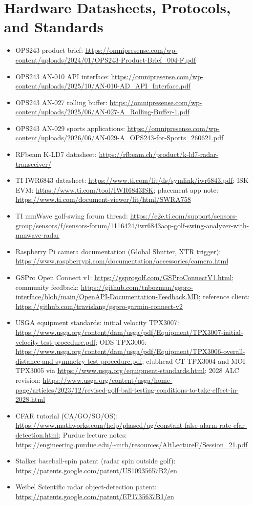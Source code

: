 \section{Hardware Datasheets, Protocols, and Standards}
\begin{itemize}\small
\item OPS243 product brief:
  \url{https://omnipresense.com/wp-content/uploads/2024/01/OPS243-Product-Brief_004-F.pdf}
\item OPS243 AN-010 API interface:
  \url{https://omnipresense.com/wp-content/uploads/2025/10/AN-010-AD_API_Interface.pdf}
\item OPS243 AN-027 rolling buffer:
  \url{https://omnipresense.com/wp-content/uploads/2025/06/AN-027-A_Rolling-Buffer-1.pdf}
\item OPS243 AN-029 sports applications:
  \url{https://omnipresense.com/wp-content/uploads/2026/06/AN-029-A_OPS243-for-Sports_260621.pdf}
\item RFbeam K-LD7 datasheet:
  \url{https://rfbeam.ch/product/k-ld7-radar-transceiver/}
\item TI IWR6843 datasheet:
  \url{https://www.ti.com/lit/ds/symlink/iwr6843.pdf}; ISK EVM:
  \url{https://www.ti.com/tool/IWR6843ISK}; placement app note:
  \url{https://www.ti.com/document-viewer/lit/html/SWRA758}
\item TI mmWave golf-swing forum thread:
  \url{https://e2e.ti.com/support/sensors-group/sensors/f/sensors-forum/1116424/iwr6843aop-golf-swing-analyzer-with-mmwave-radar}
\item Raspberry Pi camera documentation (Global Shutter, XTR trigger):
  \url{https://www.raspberrypi.com/documentation/accessories/camera.html}
\item GSPro Open Connect v1: \url{https://gsprogolf.com/GSProConnectV1.html};
  community feedback:
  \url{https://github.com/tnbozman/gspro-interface/blob/main/OpenAPI-Documentation-Feedback.MD};
  reference client:
  \url{https://github.com/travislang/gspro-garmin-connect-v2}
\item USGA equipment standards: initial velocity TPX3007:
  \url{https://www.usga.org/content/dam/usga/pdf/Equipment/TPX3007-initial-velocity-test-procedure.pdf};
  ODS TPX3006:
  \url{https://www.usga.org/content/dam/usga/pdf/Equipment/TPX3006-overall-distance-and-symmetry-test-procedure.pdf};
  clubhead CT TPX3004 and MOI TPX3005 via
  \url{https://www.usga.org/equipment-standards.html};
  2028 ALC revision:
  \url{https://www.usga.org/content/usga/home-page/articles/2023/12/revised-golf-ball-testing-conditions-to-take-effect-in-2028.html}
\item CFAR tutorial (CA/GO/SO/OS):
  \url{https://www.mathworks.com/help/phased/ug/constant-false-alarm-rate-cfar-detection.html};
  Purdue lecture notes:
  \url{https://engineering.purdue.edu/~mrb/resources/AltLectureF/Session_21.pdf}
\item Stalker baseball-spin patent (radar spin outside golf):
  \url{https://patents.google.com/patent/US10935657B2/en}
\item Weibel Scientific radar object-detection patent:
  \url{https://patents.google.com/patent/EP1735637B1/en}
\end{itemize}

